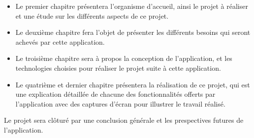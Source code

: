 \begin{small}
    \begin{itemize}
        \item Le premier chapitre présentera l'organisme d'accueil, ainsi le projet à réaliser et une étude sur les différents aspects de ce projet.
        \item Le deuxième chapitre fera l'objet de présenter les différents besoins qui seront achevés par cette application.
        \item Le troisième chapitre sera à propos la conception de l'application, et les technologies choisies pour réaliser le projet suite à cette application.
        \item Le quatrième et dernier chapitre présentera la réalisation de ce projet, qui est une explication détaillée de chacune des fonctionnalités offerts par l'application avec des captures d'écran pour illustrer le travail réalisé.
    \end{itemize}

    \noindent Le projet sera clôturé par une conclusion générale et les prespectives futures de l'application.
\end{small}